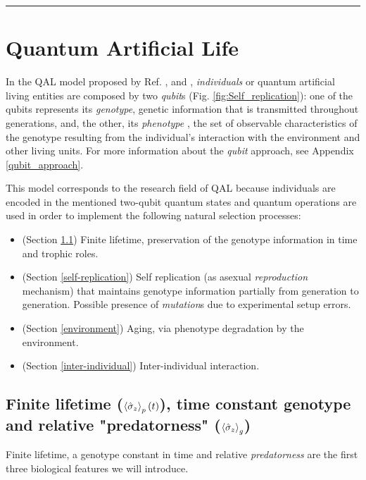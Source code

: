 \documentclass[11pt]{article}
\numberwithin{equation}{section} %
\numberwithin{figure}{section} %
\begin{document}
\noindent
{\color{red} \rule{\linewidth}{0.5mm} }



\newpage

\section{Quantum Artificial Life}

In the QAL model proposed by Ref. \cite{QAL_IBM}, \cite{AL_in_QT} and \cite{Bio_Cloning}, \emph{individuals} or quantum artificial living entities are composed by two \emph{qubit}s (Fig. \ref{fig:Self_replication}): one of the qubits represents its \emph{genotype}, genetic information that is transmitted throughout generations, and, the other, its \emph{phenotype} \cite[p.~2, l.~9-12]{QAL_IBM}\cite[p.~1, l.~35-37]{AL_in_QT}, the set of observable characteristics of the genotype resulting from the individual's interaction with the environment and other living units. For more information about the \emph{qubit} approach, see Appendix \ref{qubit_approach}.

This model corresponds to the research field of QAL because individuals are encoded in the mentioned two-qubit quantum states and quantum operations are used in order to implement the following natural selection processes:
\begin{itemize}
\item (Section \ref{age_and_predatorness}) Finite lifetime, preservation of the genotype information in time and trophic roles. 
\item (Section \ref{self-replication}) Self replication (as asexual \emph{reproduction} mechanism) that maintains genotype information partially from generation to generation. Possible presence of \emph{mutation}s due to experimental setup errors.
\item (Section \ref{environment}) Aging, via phenotype degradation by the environment.
\item (Section \ref{inter-individual}) Inter-individual interaction.
\end{itemize}

\subsection{Finite lifetime ($\braket{\hat{\sigma}_z}_p(t)$), time constant genotype and relative "predatorness" ($\braket{\hat{\sigma}_z}_g$)} \label{age_and_predatorness}

Finite lifetime, a genotype constant in time and relative \emph{predatorness} are the first three biological features we will introduce.
\end{document}
